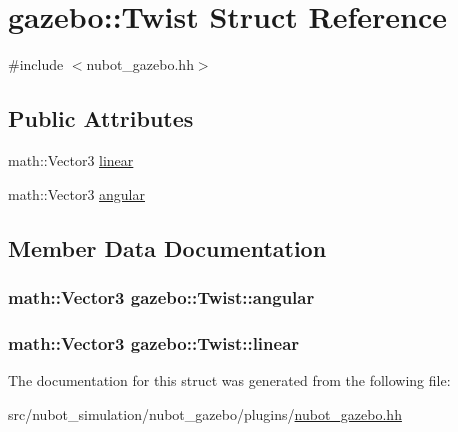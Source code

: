 \hypertarget{structgazebo_1_1Twist}{\section{gazebo\-:\-:Twist Struct Reference}
\label{structgazebo_1_1Twist}
}


{\ttfamily \#include $<$nubot\-\_\-gazebo.\-hh$>$}

\subsection*{Public Attributes}
\begin{DoxyCompactItemize}
\item 
math\-::\-Vector3 \hyperlink{structgazebo_1_1Twist_afbb8ffd807cad3c63479f4624b192301}{linear}
\item 
math\-::\-Vector3 \hyperlink{structgazebo_1_1Twist_a7d2c10e52786244a11d3b94486313cd0}{angular}
\end{DoxyCompactItemize}


\subsection{Member Data Documentation}
\hypertarget{structgazebo_1_1Twist_a7d2c10e52786244a11d3b94486313cd0}{
\subsubsection[{angular}]{\setlength{\rightskip}{0pt plus 5cm}math\-::\-Vector3 gazebo\-::\-Twist\-::angular}}\label{structgazebo_1_1Twist_a7d2c10e52786244a11d3b94486313cd0}
\hypertarget{structgazebo_1_1Twist_afbb8ffd807cad3c63479f4624b192301}{
\subsubsection[{linear}]{\setlength{\rightskip}{0pt plus 5cm}math\-::\-Vector3 gazebo\-::\-Twist\-::linear}}\label{structgazebo_1_1Twist_afbb8ffd807cad3c63479f4624b192301}


The documentation for this struct was generated from the following file\-:\begin{DoxyCompactItemize}
\item 
src/nubot\-\_\-simulation/nubot\-\_\-gazebo/plugins/\hyperlink{nubot__gazebo_8hh}{nubot\-\_\-gazebo.\-hh}\end{DoxyCompactItemize}
